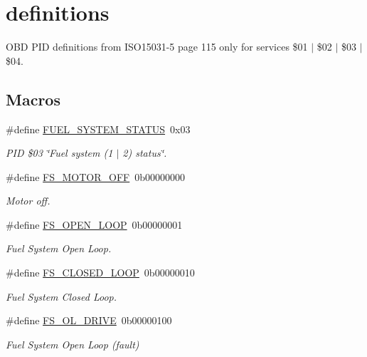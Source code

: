 \hypertarget{group__OBD__PID}{}\section{definitions}
\label{group__OBD__PID}


O\+BD P\+ID definitions from I\+S\+O15031-\/5 page 115 only for services \$01 $\vert$ \$02 $\vert$ \$03 $\vert$ \$04.  


\subsection*{Macros}
\begin{DoxyCompactItemize}
\item 
\mbox{\label{group__OBD__PID_ga797d0d308a5ad4cc5aedc183e5d82880}} 
\#define \hyperlink{group__OBD__PID_ga797d0d308a5ad4cc5aedc183e5d82880}{F\+U\+E\+L\+\_\+\+S\+Y\+S\+T\+E\+M\+\_\+\+S\+T\+A\+T\+US}~0x03
\begin{DoxyCompactList}\small\item\em P\+ID \$03 \char`\"{}\+Fuel system (1 $\vert$ 2) status\char`\"{}. \end{DoxyCompactList}\item 
\#define \hyperlink{group__OBD__PID_ga93772e290018e845a98cbbaeb35dcd37}{F\+S\+\_\+\+M\+O\+T\+O\+R\+\_\+\+O\+FF}~0b00000000
\begin{DoxyCompactList}\small\item\em Motor off. \end{DoxyCompactList}\item 
\#define \hyperlink{group__OBD__PID_ga6790f8066998a98d1f3fa7697624e5aa}{F\+S\+\_\+\+O\+P\+E\+N\+\_\+\+L\+O\+OP}~0b00000001
\begin{DoxyCompactList}\small\item\em Fuel System Open Loop. \end{DoxyCompactList}\item 
\#define \hyperlink{group__OBD__PID_ga54a7650e3e2514c88c5f47e8942b8241}{F\+S\+\_\+\+C\+L\+O\+S\+E\+D\+\_\+\+L\+O\+OP}~0b00000010
\begin{DoxyCompactList}\small\item\em Fuel System Closed Loop. \end{DoxyCompactList}\item 
\#define \hyperlink{group__OBD__PID_ga34834380e007e3b34b93416cadfbaea4}{F\+S\+\_\+\+O\+L\+\_\+\+D\+R\+I\+VE}~0b00000100
\begin{DoxyCompactList}\small\item\em Fuel System Open Loop (fault) \end{DoxyCompactList}\item 

\end{DoxyCompactItemize}
